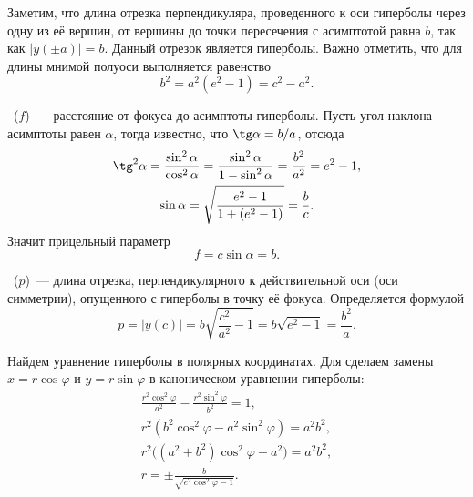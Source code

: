 Заметим, что длина отрезка перпендикуляра, проведенного к оси гиперболы через одну из её вершин, от вершины до точки пересечения с асимптотой равна $b$, так как $|y(\pm a)| = b$. Данный отрезок является  гиперболы. Важно отметить, что для длины мнимой полуоси выполняется равенство
\begin{equation*}
	b^2 = a^2 (e^2 - 1) = c^2 - a^2.
\end{equation*}

~($f$)~--- расстояние от фокуса до асимптоты гиперболы. Пусть угол наклона асимптоты равен $\alpha$, тогда известно, что $\tg \alpha = b/a$, отсюда
\begin{gather*}
	\tg^2 \alpha = \frac{\sin^2 \alpha}{\cos^2 \alpha} = \frac{\sin^2 \alpha}{1 - \sin^2 \alpha} = \frac{b^2}{a^2} = e^2 - 1,\\
	\sin \alpha =\sqrt{\frac{e^2 - 1}{1 + (e^2 - 1)}} = \frac{b}{c}.
\end{gather*}
Значит прицельный параметр
\begin{equation}
	f = c \sin \alpha = b.
\end{equation}

~($p$)~--- длина отрезка, перпендикулярного к действительной оси (оси симметрии), опущенного с гиперболы в точку её фокуса. Определяется формулой
\begin{equation}
	p= |y(c)| = b\sqrt{\frac{c^2}{a^2} - 1} = b \sqrt{e^2 - 1} = \frac{b^2}{a}.
\end{equation}

Найдем уравнение гиперболы в полярных координатах. Для сделаем замены $x = r \cos \varphi$ и $y = r \sin \varphi$ в каноническом уравнении гиперболы:
\begin{gather*}
	\frac{r^2 \cos^2 \varphi}{a^2} - \frac{r^2 \sin^2 \varphi}{b^2} = 1,\\
	r^2 ( b^2 \cos^2 \varphi - a^2 \sin^2 \varphi) = a^2 b^2,\\
	r^2 \big( (a^2 + b^2) \cos^2 \varphi - a^2 \big) = a^2 b^2,\\
	r = \pm\frac{b}{\sqrt{e^2 \cos^2 \varphi - 1}}.
\end{gather*}

